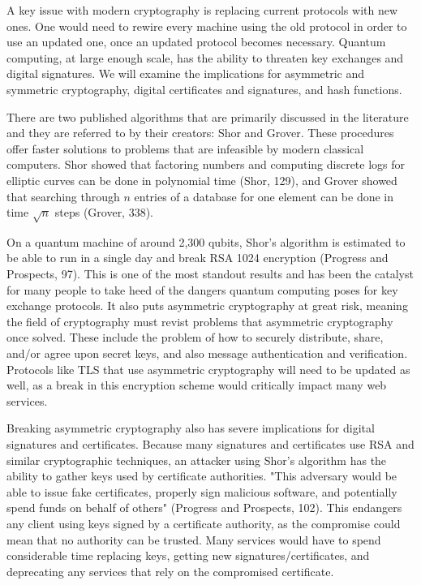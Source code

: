 \documentclass[11pt]{article}
\begin{document}
A key issue with modern cryptography is replacing current protocols with new ones.
One would need to rewire every machine using the old protocol in order to use an updated one, once an updated protocol becomes necessary.
Quantum computing, at large enough scale, has the ability to threaten key exchanges and digital signatures.
We will examine the implications for asymmetric and symmetric cryptography, digital certificates and signatures, and hash functions.

There are two published algorithms that are primarily discussed in the literature and they are referred to by their creators: Shor and Grover.
These procedures offer faster solutions to problems that are infeasible by modern classical
computers.
Shor showed that factoring numbers and computing discrete logs for elliptic curves can be done in polynomial time (Shor, 129), and Grover showed that searching through $n$ entries of a database for one element can be done in time $\sqrt{n}$ steps (Grover, 338).

On a quantum machine of around 2,300 qubits, Shor's algorithm is estimated to be able to run in a single day and break RSA 1024 encryption (Progress and Prospects, 97).
This is one of the most standout results and has been the catalyst for many people
to take heed of the dangers quantum computing poses for key exchange protocols.
It also puts asymmetric cryptography at great risk, meaning the field of cryptography must revist problems that asymmetric cryptography once solved. These include the problem of how to securely distribute, share, and/or agree upon secret keys, and also message authentication and verification.
Protocols like TLS that use asymmetric cryptography will need to be updated as well, as a break in this encryption scheme would
critically impact many web services. 


Breaking asymmetric cryptography also has severe implications for digital signatures and certificates.
Because many signatures and certificates use RSA and similar cryptographic techniques, an attacker using Shor's algorithm has the ability to gather keys used by certificate authorities.
"This adversary would be able to issue fake certificates, properly sign malicious
software, and potentially spend funds on behalf of others" (Progress and Prospects, 102).
This endangers any client using keys signed by a certificate authority, as the
compromise could mean that no authority can be trusted.
Many services would have to spend considerable time replacing keys, getting new
signatures/certificates, and deprecating any services that rely on the
compromised certificate.
\end{document}

